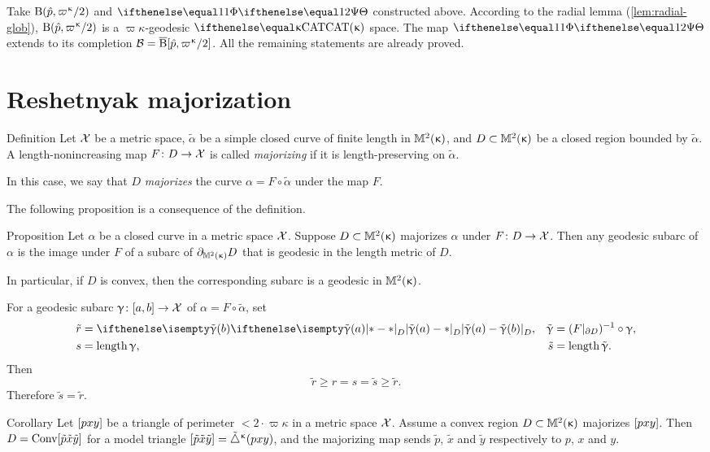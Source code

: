 Take $\oBall(\hat p,\varpi\kappa/2)$ and $\map$ constructed above.
According to the radial lemma (\ref{lem:radial-glob}), $\oBall(\hat p,\varpi\kappa/2)$ is a $\varpi\kappa$-geodesic $\CAT\kappa$ space.
The map $\map$ extends to its completion $\spc{B}=\cBall[\hat p,\varpi\kappa/2]$. 
All the remaining statements are already proved.
\qeds

\section{Reshetnyak majorization}\label{sec:resh-kirz}

\begin{thm}{Definition}\label{def:majorize}
Let $\mathcal{X}$ be a metric space,
$\tilde \alpha$ be a simple closed curve of finite length  in $\mathbb{M}_{{}}^{2}({\upkappa})$,
and $D\subset\Lob2{\kappa}$ be a closed region bounded by $\tilde \alpha$.
A length-nonincreasing map $F\:D\to\spc{X}$ is called \emph{majorizing} if it is length-preserving on $\tilde \alpha$.

In this case, we say that $D$ \emph{majorizes} the curve $\alpha=F\circ\tilde \alpha$ under the map $F$.
\end{thm}

The following proposition is a consequence of the definition.

\begin{thm}{Proposition}
\label{prop:majorize-geodesic} 
Let  $\alpha$  be a closed curve in a metric space $\mathcal{X}$.
Suppose $D\subset\Lob2{\kappa}$ majorizes $\alpha$ under $F\: D \to \spc{X}$.  
Then any geodesic subarc of $\alpha$ is the image under $F$ of a subarc of $\partial_{\mathbb{M}_{{}}^{2}({\upkappa})} D$ that is geodesic in the length metric of $D$.

In particular, if $D$ is convex, then the corresponding subarc is a geodesic in $\mathbb{M}_{{}}^{2}({\upkappa})$.
\end{thm}

 For a geodesic subarc $\gamma\:[a,b]\to\spc{X}$ of $\alpha=F\circ\tilde \alpha$, set
\begin{align*}
\tilde r&=\dist{\tilde \gamma(a)}{\tilde \gamma(b)}{D},
&
\tilde \gamma &= (F|_{\Fr D})^{-1}\circ\gamma,
\\
s&=\length \gamma,
&
\tilde s&= \length \tilde \gamma.
\end{align*}
Then
\[\tilde r\ge r = s =\tilde s\ge\tilde r.\]
Therefore $\tilde s=\tilde r$.
\qeds

\begin{thm}{Corollary}\label{cor:maj-triangle}
Let $[{p}{x}{y}]$ be a triangle of perimeter $<2\cdot\varpi\kappa$ in a metric space $\mathcal{X}$. Assume a convex region $D\subset \Lob2\kappa$ majorizes $[{p}{x}{y}]$.
Then $D=\mathop{\rm Conv}\nolimits[{\tilde p}{\tilde x}{\tilde y}]$ for a model triangle $[{\tilde p}{\tilde x}{\tilde y}]={\tilde\triangle}^{\upkappa}(p x y)$, and the majorizing map sends  $\tilde p$, $\tilde x$ and $\tilde y$ respectively to $p$, $x$ and $y$.
\end{thm}

